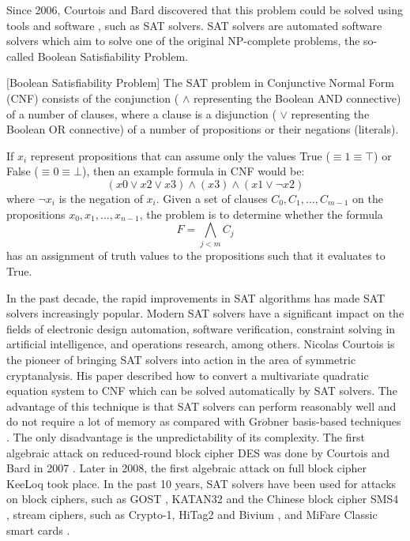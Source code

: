 Since 2006, Courtois and Bard discovered that this problem could be solved using tools and software \cite{courtois2007algebraicDES}, such as SAT solvers. SAT solvers are automated software solvers which aim to solve one of the original NP-complete problems, the so-called Boolean Satisfiability Problem. 
\begin{mydef} \label{def:booleanSat}[Boolean Satisfiability Problem] 
The SAT problem in Conjunctive Normal Form (CNF) consists of the conjunction ( $\wedge$  representing the Boolean AND connective) of a number of clauses, where a clause is a disjunction ( $\vee$ representing the Boolean OR connective) of a number of propositions or their negations (literals).

If $x_{i}$ represent propositions that can assume only the values True ($\equiv 1 \equiv \top$) or False ($\equiv 0 \equiv \bot$), then an example formula in CNF would be:
$$(x0 \vee x2 \vee x3) \wedge (x3) \wedge (x1 \vee \lnot x2)$$
where $\lnot x_{i}$ is the negation of $x_{i}$.
Given a set of clauses $C_{0}, C_{1}, ... , C_{m-1}$ on the propositions $x_{0}, x_{1}, ... , x_{n-1}$, the problem is to
determine whether the formula $$ F = \bigwedge_{j<m} C_{j}$$ has an assignment of truth values to the propositions such
that it evaluates to True.	
\end{mydef}
In the past decade, the rapid improvements in SAT algorithms has made SAT solvers increasingly popular. Modern SAT solvers have a significant impact on the fields of  electronic design automation, software verification, constraint solving in artificial intelligence, and operations research, among others.  Nicolas Courtois is the pioneer of bringing SAT solvers into action in the area of symmetric cryptanalysis. His paper \cite{bard2007efficient} described how to convert a multivariate quadratic equation system to CNF which can be solved automatically by SAT solvers. The advantage of this technique is that SAT solvers can perform reasonably well and do not require a lot of memory as compared with Gr$\ddot{o}$bner basis-based techniques \cite{grobner}. The only disadvantage is the unpredictability of its complexity. The first algebraic attack on reduced-round block cipher DES was done by Courtois and Bard in 2007 \cite{DEScourtois}. Later in 2008, the first algebraic attack on full block cipher KeeLoq \cite{courtois2008algebraicKeeLoq} took place. In the past 10 years, SAT solvers have been used for attacks on block ciphers, such as GOST \cite{courtois2012contradiction,gostac}, KATAN32 \cite{bard2010algebraic} and the Chinese block cipher SMS4 \cite{erickson2010algebraic},  stream ciphers, such as Crypto-1, HiTag2 and Bivium \cite{soos2009extending,courtois2009practical}, and MiFare Classic smart cards \cite{courtois2008algebraic}.


